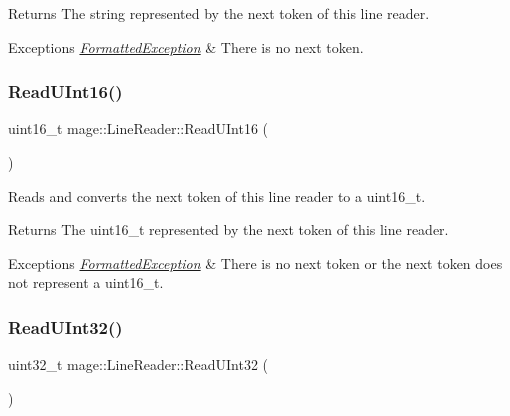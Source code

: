 \begin{DoxyReturn}{Returns}
The string represented by the next token of this line reader. 
\end{DoxyReturn}

\begin{DoxyExceptions}{Exceptions}
{\em \hyperlink{structmage_1_1_formatted_exception}{Formatted\+Exception}} & There is no next token. \\
\hline
\end{DoxyExceptions}
\hypertarget{classmage_1_1_line_reader_a89f8d84257eae17db8c1e67d17f839f9}{}\label{classmage_1_1_line_reader_a89f8d84257eae17db8c1e67d17f839f9} 
\subsubsection{\texorpdfstring{Read\+U\+Int16()}{ReadUInt16()}}
{\footnotesize\ttfamily uint16\+\_\+t mage\+::\+Line\+Reader\+::\+Read\+U\+Int16 (\begin{DoxyParamCaption}{ }\end{DoxyParamCaption})\hspace{0.3cm}{\ttfamily [protected]}}

Reads and converts the next token of this line reader to a {\ttfamily uint16\+\_\+t}.

\begin{DoxyReturn}{Returns}
The {\ttfamily uint16\+\_\+t} represented by the next token of this line reader. 
\end{DoxyReturn}

\begin{DoxyExceptions}{Exceptions}
{\em \hyperlink{structmage_1_1_formatted_exception}{Formatted\+Exception}} & There is no next token or the next token does not represent a {\ttfamily uint16\+\_\+t}. \\
\hline
\end{DoxyExceptions}
\hypertarget{classmage_1_1_line_reader_a82d14aede3b4ebff8cc54345dfba2c4b}{}\label{classmage_1_1_line_reader_a82d14aede3b4ebff8cc54345dfba2c4b} 
\subsubsection{\texorpdfstring{Read\+U\+Int32()}{ReadUInt32()}}
{\footnotesize\ttfamily uint32\+\_\+t mage\+::\+Line\+Reader\+::\+Read\+U\+Int32 (\begin{DoxyParamCaption}{ }\end{DoxyParamCaption})\hspace{0.3cm}{\ttfamily [protected]}}

